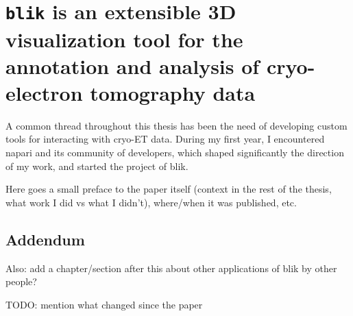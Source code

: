 \chapter[\texttt{blik}: a cryo-ET visualisation and analysis tool]{\texttt{blik} is an extensible 3D visualization tool for the annotation and analysis of cryo-electron tomography data}

A common thread throughout this thesis has been the need of developing custom tools for interacting with cryo-ET data.
During my first year, I encountered napari and its community of developers, which shaped significantly the direction of my work, and started the project of blik.

Here goes a small preface to the paper itself (context in the rest of the thesis, what work I did vs what I didn't), where/when it was published, etc.

\localtableofcontents  %

% 

\section{Addendum}

Also: add a chapter/section after this about other applications of blik by other people?

TODO: mention what changed since the paper
